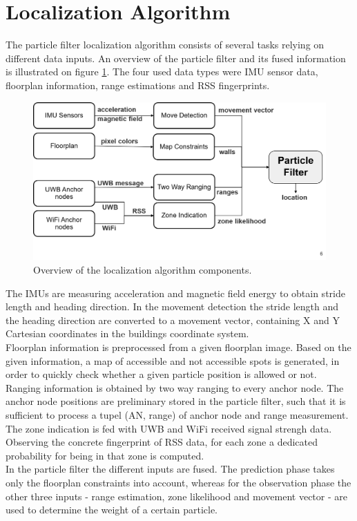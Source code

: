 \section{Localization Algorithm}
The particle filter localization algorithm consists of several tasks relying on different data inputs. An overview of the particle filter and its fused information is illustrated on figure \ref{fig:localization_algorithm}. The four used data types were IMU sensor data, floorplan information, range estimations and RSS fingerprints.\\
\begin{figure}[th]
\centering
\includegraphics[width=1.0\textwidth]{Figures/localization_algorithm}
\decoRule
\caption[Localization Algorithm]{Overview of the localization algorithm components.}
\label{fig:localization_algorithm}
\end{figure}

\noindent\hspace*{5mm}%
The IMUs are measuring acceleration and magnetic field energy to obtain stride length and heading direction. In the movement detection the stride length and the heading direction are converted to a movement vector, containing X and Y Cartesian coordinates in the buildings coordinate system.\\
\noindent\hspace*{5mm}%
Floorplan information is preprocessed from a given floorplan image. Based on the given information, a map of accessible and not accessible spots is generated, in order to quickly check whether a given particle position is allowed or not.\\
\noindent\hspace*{5mm}%
Ranging information is obtained by two way ranging to every anchor node. The anchor node positions are preliminary stored in the particle filter, such that it is sufficient to process a tupel (AN, range) of anchor node and range measurement.\\
\noindent\hspace*{5mm}%
The zone indication is fed with UWB and WiFi received signal strengh data. Observing the concrete fingerprint of RSS data, for each zone a dedicated probability for being in that zone is computed.\\
\noindent\hspace*{5mm}%
In the particle filter the different inputs are fused. The prediction phase takes only the floorplan constraints into account, whereas for the observation phase the other three inputs - range estimation, zone likelihood and movement vector - are used to determine the weight of a certain particle.